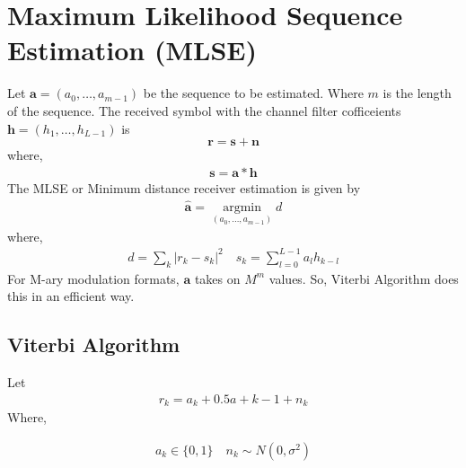 \documentclass[journal,12pt,twocolumn]{IEEEtran}
\begin{document}
\section{Maximum Likelihood Sequence Estimation (MLSE)}
Let  $\textbf{a} = (a_0,\dots, a_{m-1})$ be the sequence to be estimated. Where $m$ is the length of the sequence. The received symbol with the channel filter cofficeients $\textbf{h} = (h_1, \dots , h_{L-1})$ is
\begin{equation}
\textbf{r} = \textbf{s} + \textbf{n}
\end{equation}
where,
\begin{align}
\textbf{s} = \textbf{a} * \textbf{h} 
\end{align}
The MLSE or Minimum distance receiver estimation is given by
\begin{align}
\hat{\textbf{a}} = \underset{(a_0,\dots, a_{m-1})}{\operatorname{argmin}} d
\end{align}
where,
\begin{align}
d = \sum_k \vert r_k - s_k \vert^2  \quad s_k = \sum_{l=0}^{L-1} a_l h_{k-l}
\end{align}
For M-ary modulation formats, $\textbf{a}$ takes on $M^m$ values. So, Viterbi Algorithm does this in an efficient way.

\subsection{Viterbi Algorithm}
Let
\begin{align}
r_k = a_k + 0.5a+{k-1} + n_k
\end{align}
Where,

\begin{align}
a_k \in \{ 0,1 \} \quad n_k \sim  N(0,\sigma^2)
\end{align}
\end{document}
